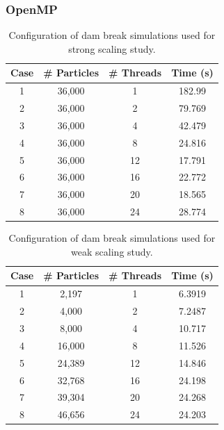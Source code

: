 \documentclass{scrartcl}
\begin{document}
    \subsubsection{OpenMP}
    \begin{table}
    	\begin{center}
        \begin{tabular}{| c | c | c | c |}
            \hline
            Case & \# Particles & \# Threads & Time (s) \\ \hline		  		
            1 & 36,000 &  1 & 182.99 \\ \hline		  		
            2 & 36,000 &  2 & 79.769 \\ \hline		  		
            3 & 36,000 &  4 & 42.479 \\ \hline		  		
            4 & 36,000 &  8 & 24.816 \\ \hline		  		
            5 & 36,000 & 12 & 17.791 \\ \hline		  		
            6 & 36,000 & 16 & 22.772 \\ \hline		  		
            7 & 36,000 & 20 & 18.565 \\ \hline		  		
            8 & 36,000 & 24 & 28.774 \\ \hline		  		
        \end{tabular}
        \caption{Configuration of dam break simulations used for strong scaling study.}
        \label{tab:ss}
        \end{center}
    \end{table}
  
    \begin{table}
    	\begin{center}
        \begin{tabular}{| c | c | c | c |}
            \hline
            Case & \# Particles & \# Threads & Time (s) \\ \hline
            1 &  2,197 &  1 & 6.3919  \\ \hline		  		
            2 &  4,000 &  2 & 7.2487 \\ \hline		  		
            3 &  8,000 &  4 & 10.717 \\ \hline		  		
            4 & 16,000 &  8 & 11.526 \\ \hline		  		
            5 & 24,389 & 12 & 14.846 \\ \hline		  		
            6 & 32,768 & 16 & 24.198 \\ \hline		  		
            7 & 39,304 & 20 & 24.268 \\ \hline		  		
            8 & 46,656 & 24 & 24.203 \\ \hline		  		
        \end{tabular}
        \caption{Configuration of dam break simulations used for weak scaling study.}
        \label{tab:ws}
        \end{center}
    \end{table}
  
\end{document}
